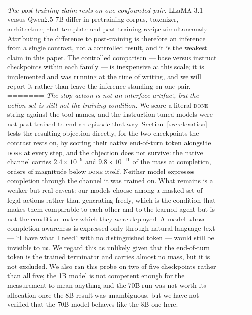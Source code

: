 \documentclass[11pt]{article}
\begin{document}
\begin{table}[t]
\begin{tabular}{lcccc}
\emph{The post-training claim rests on one confounded pair.} LLaMA-3.1 versus
Qwen2.5-7B differ in pretraining corpus, tokenizer, architecture, chat template
and post-training recipe simultaneously. Attributing the difference to
post-training is therefore an inference from a single contrast, not a controlled
result, and it is the weakest claim in this paper. The controlled comparison ---
base versus instruct checkpoints within each family --- is inexpensive at this
scale; it is implemented and was running at the time of writing, and we will
report it rather than leave the inference standing on one pair.
=======
\emph{The stop action is not an interface artifact, but the action set is still
not the training condition.} We score a literal \textsc{done} string against the
tool names, and the instruction-tuned models were not post-trained to end an
episode that way. Section~\ref{sec:elevation} tests the resulting objection
directly, for the two checkpoints the contrast rests on, by scoring their native
end-of-turn token alongside \textsc{done} at every step, and the objection does
not survive: the native
channel carries $2.4\times10^{-9}$ and $9.8\times10^{-11}$ of the mass at
completion, orders of magnitude below \textsc{done} itself. Neither model
expresses completion through the channel it was trained on. What remains is a
weaker but real caveat: our models choose among a masked set of legal actions
rather than generating freely, which is the condition that makes them comparable
to each other and to the learned agent but is not the condition under which they
were deployed. A model whose completion-awareness is expressed only through
natural-language text --- ``I have what I need'' with no distinguished token ---
would still be invisible to us. We regard this as unlikely given that the
end-of-turn token is the trained terminator and carries almost no mass, but it is
not excluded. We also ran this probe on two of five checkpoints rather than all
five; the 1B model is not competent enough for the measurement to mean anything
and the 70B run was not worth its allocation once the 8B result was unambiguous,
but we have not verified that the 70B model behaves like the 8B one here.


\end{tabular}
\end{table}
\end{document}

